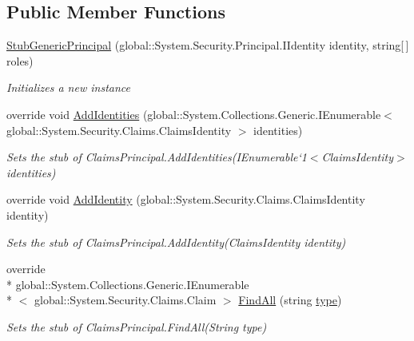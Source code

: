 \subsection*{Public Member Functions}
\begin{DoxyCompactItemize}
\item 
\hyperlink{class_system_1_1_security_1_1_principal_1_1_fakes_1_1_stub_generic_principal_a85c1ba3a86ec6f95fccb649cbd010030}{Stub\-Generic\-Principal} (global\-::\-System.\-Security.\-Principal.\-I\-Identity identity, string\mbox{[}$\,$\mbox{]} roles)
\begin{DoxyCompactList}\small\item\em Initializes a new instance\end{DoxyCompactList}\item 
override void \hyperlink{class_system_1_1_security_1_1_principal_1_1_fakes_1_1_stub_generic_principal_a80637398e86a79f00acbb9a86a4ba894}{Add\-Identities} (global\-::\-System.\-Collections.\-Generic.\-I\-Enumerable$<$ global\-::\-System.\-Security.\-Claims.\-Claims\-Identity $>$ identities)
\begin{DoxyCompactList}\small\item\em Sets the stub of Claims\-Principal.\-Add\-Identities(I\-Enumerable`1$<$Claims\-Identity$>$ identities)\end{DoxyCompactList}\item 
override void \hyperlink{class_system_1_1_security_1_1_principal_1_1_fakes_1_1_stub_generic_principal_a6e5187b13c64b15117e8f630818f645c}{Add\-Identity} (global\-::\-System.\-Security.\-Claims.\-Claims\-Identity identity)
\begin{DoxyCompactList}\small\item\em Sets the stub of Claims\-Principal.\-Add\-Identity(\-Claims\-Identity identity)\end{DoxyCompactList}\item 
override \\*
global\-::\-System.\-Collections.\-Generic.\-I\-Enumerable\\*
$<$ global\-::\-System.\-Security.\-Claims.\-Claim $>$ \hyperlink{class_system_1_1_security_1_1_principal_1_1_fakes_1_1_stub_generic_principal_a53e14ac13860812f22f8732426c97875}{Find\-All} (string \hyperlink{jquery-1_810_82-vsdoc_8js_a3940565e83a9bfd10d95ffd27536da91}{type})
\begin{DoxyCompactList}\small\item\em Sets the stub of Claims\-Principal.\-Find\-All(\-String type)\end{DoxyCompactList}\item 

\end{DoxyCompactItemize}
